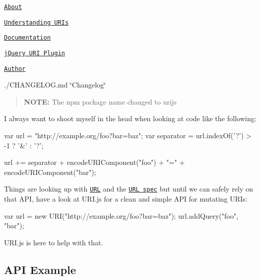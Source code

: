 \href{https://cdnjs.com/libraries/URI.js}{\tt }
\begin{DoxyItemize}
\item \href{http://medialize.github.io/URI.js/}{\tt About}
\item \href{http://medialize.github.io/URI.js/about-uris.html}{\tt Understanding U\+R\+Is}
\item \href{http://medialize.github.io/URI.js/docs.html}{\tt Documentation}
\item \href{http://medialize.github.io/URI.js/jquery-uri-plugin.html}{\tt j\+Query U\+RI Plugin}
\item \href{http://rodneyrehm.de/en/}{\tt Author}
\item ./\+C\+H\+A\+N\+G\+E\+L\+OG.md \char`\"{}\+Changelog\char`\"{} 


\end{DoxyItemize}

\begin{quote}
{\bfseries N\+O\+TE\+:} The npm package name changed to {\ttfamily urijs} \end{quote}




I always want to shoot myself in the head when looking at code like the following\+:


\begin{DoxyCode}
var url = "http://example.org/foo?bar=baz";
var separator = url.indexOf('?') > -1 ? '&' : '?';

url += separator + encodeURIComponent("foo") + "=" + encodeURIComponent("bar");
\end{DoxyCode}


Things are looking up with \href{https://developer.mozilla.org/en/docs/Web/API/URL}{\tt U\+RL} and the \href{http://url.spec.whatwg.org/}{\tt U\+RL spec} but until we can safely rely on that A\+PI, have a look at U\+R\+I.\+js for a clean and simple A\+PI for mutating U\+R\+Is\+:


\begin{DoxyCode}
var url = new URI("http://example.org/foo?bar=baz");
url.addQuery("foo", "bar");
\end{DoxyCode}


U\+R\+I.\+js is here to help with that.

\subsection*{A\+PI Example}


